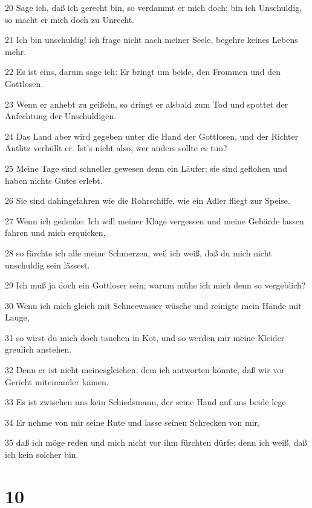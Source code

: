 \par 20 Sage ich, daß ich gerecht bin, so verdammt er mich doch; bin ich Unschuldig, so macht er mich doch zu Unrecht.
\par 21 Ich bin unschuldig! ich frage nicht nach meiner Seele, begehre keines Lebens mehr.
\par 22 Es ist eins, darum sage ich: Er bringt um beide, den Frommen und den Gottlosen.
\par 23 Wenn er anhebt zu geißeln, so dringt er alsbald zum Tod und spottet der Anfechtung der Unschuldigen.
\par 24 Das Land aber wird gegeben unter die Hand der Gottlosen, und der Richter Antlitz verhüllt er. Ist's nicht also, wer anders sollte es tun?
\par 25 Meine Tage sind schneller gewesen denn ein Läufer; sie sind geflohen und haben nichts Gutes erlebt.
\par 26 Sie sind dahingefahren wie die Rohrschiffe, wie ein Adler fliegt zur Speise.
\par 27 Wenn ich gedenke: Ich will meiner Klage vergessen und meine Gebärde lassen fahren und mich erquicken,
\par 28 so fürchte ich alle meine Schmerzen, weil ich weiß, daß du mich nicht unschuldig sein lässest.
\par 29 Ich muß ja doch ein Gottloser sein; warum mühe ich mich denn so vergeblich?
\par 30 Wenn ich mich gleich mit Schneewasser wüsche und reinigte mein Hände mit Lauge,
\par 31 so wirst du mich doch tauchen in Kot, und so werden mir meine Kleider greulich anstehen.
\par 32 Denn er ist nicht meinesgleichen, dem ich antworten könnte, daß wir vor Gericht miteinander kämen.
\par 33 Es ist zwischen uns kein Schiedsmann, der seine Hand auf uns beide lege.
\par 34 Er nehme von mir seine Rute und lasse seinen Schrecken von mir,
\par 35 daß ich möge reden und mich nicht vor ihm fürchten dürfe; denn ich weiß, daß ich kein solcher bin.

\chapter{10}

